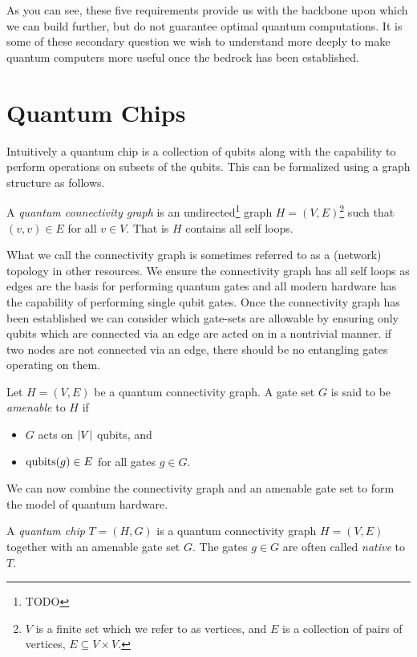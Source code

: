 As you can see, these five requirements provide us with the backbone upon which we can build further, but do not guarantee optimal quantum computations.
It is some of these secondary question we wish to understand more deeply to make quantum computers more useful once the bedrock has been established.

\section{Quantum Chips}

Intuitively a quantum chip is a collection of qubits along with the capability to perform operations on subsets of the qubits.
This can be formalized using a graph structure as follows. %

\begin{definition}\label{def:topology}
    A \emph{quantum connectivity graph} is an undirected\footnote{TODO} graph $H = (V, E)$\footnote{$V$ is a finite set which we refer to as vertices, and $E$ is a collection of pairs of vertices, \ie{} $E \subseteq V \times V$.} such that $(v, v) \in E$ for all $v \in V$.
    That is $H$ contains all self loops.
\end{definition}
What we call the connectivity graph is sometimes referred to as a (network) topology in other resources.
We ensure the connectivity graph has all self loops as edges are the basis for performing quantum gates and all modern hardware has the capability of performing single qubit gates.
Once the connectivity graph has been established we can consider which gate-sets are allowable by ensuring only qubits which are connected via an edge are acted on in a nontrivial manner.
\Ie{} if two nodes are not connected via an edge, there should be no entangling gates operating on them. %
\begin{definition}
    Let $H = (V, E)$ be a quantum connectivity graph.
    A gate set $G$ is said to be \emph{amenable} to $H$ if
    \begin{itemize}
        \item $G$ acts on $\abs{V}$ qubits, and
        \item $\operatorname{qubits}(g) \in E$ for all gates $g \in G$.
    \end{itemize}
\end{definition}
We can now combine the connectivity graph and an amenable gate set to form the model of quantum hardware.
\begin{definition}
    A \emph{quantum chip} $T = (H, G)$ is a quantum connectivity graph $H = (V, E)$ together with an amenable gate set $G$.
    The gates $g \in G$ are often called \emph{native} to $T$.
\end{definition}


